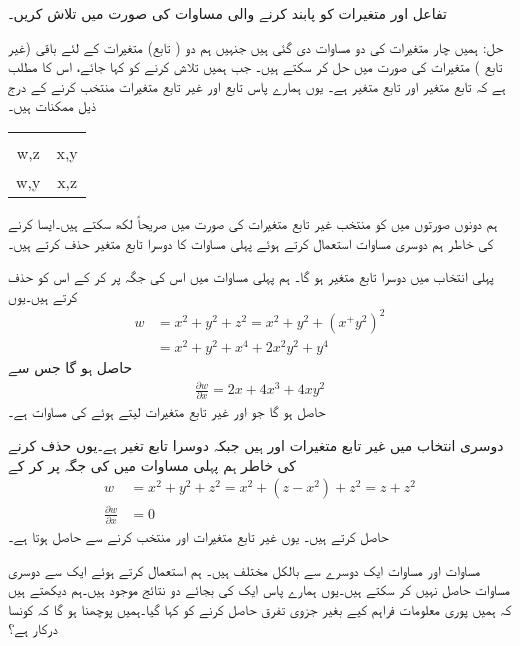 تفاعل  اور متغیرات کو پابند کرنے والی مساوات  کی صورت میں  تلاش کریں۔

حل:\quad
ہمیں چار متغیرات کی دو مساوات دی گئی ہیں جنہیں ہم دو ( تابع)  متغیرات کے لئے  باقی (غیر تابع ) متغیرات کی صورت میں  حل کر سکتے ہیں۔ جب ہمیں  تلاش کرنے کو کہا جائے،  اس کا مطلب ہے کہ  تابع متغیر اور  تابع متغیر ہے۔ یوں ہمارے پاس تابع اور غیر تابع متغیرات منتخب کرنے کے درج ذیل ممکنات ہیں۔
\begin{center}
\begin{tabular}{CC}
&\\
w,z&x,y\\
w,y&x,z
\end{tabular}
\end{center}
ہم دونوں صورتوں میں    کو منتخب غیر تابع متغیرات کی صورت میں  صریحاً لکھ سکتے ہیں۔ایسا کرنے کی خاطر ہم دوسری مساوات   استعمال کرتے ہوئے پہلی مساوات کا    دوسرا تابع متغیر   حذف کرتے ہیں۔ 

پہلی انتخاب میں  دوسرا تابع متغیر ہو گا۔ ہم پہلی مساوات میں اس کی جگہ  پر کر کے اس کو حذف  کرتے ہیں۔یوں
\begin{align*}
w&=x^2+y^2+z^2=x^2+y^2+(x^+y^2)^2\\
&=x^2+y^2+x^4+2x^2y^2+y^4
\end{align*}
حاصل ہو گا جس سے
\begin{align}\label{مساوات_کثیرالمتغیر_پہلا_جواب}
\frac{\partial w}{\partial x}=2x+4x^3+4xy^2
\end{align}
 حاصل ہو گا جو   اور  غیر تابع متغیرات لیتے ہوئے  کی مساوات ہے۔

دوسری  انتخاب میں غیر تابع متغیرات  اور  ہیں جبکہ دوسرا تابع تغیر  ہے۔یوں  حذف  کرنے کی خاطر ہم پہلی مساوات میں  کی جگہ  پر کر کے
\begin{align}
w&=x^2+y^2+z^2=x^2+(z-x^2)+z^2=z+z^2\nonumber\\
\tfrac{\partial w}{\partial x}&=0\label{مساوات_کثیرالمتغیر_دوسرا_جواب}
\end{align}
حاصل کرتے ہیں۔ یوں  غیر تابع متغیرات  اور  منتخب کرنے سے  حاصل ہوتا ہے۔

مساوات  اور مساوات  ایک دوسرے سے بالکل مختلف ہیں۔ ہم  استعمال کرتے ہوئے ایک سے دوسری مساوات حاصل نہیں کر سکتے ہیں۔یوں ہمارے پاس  ایک  کی بجائے  دو نتائج موجود ہیں۔ہم دیکھتے ہیں کہ ہمیں   پوری معلومات فراہم کیے بغیر  جزوی تفرق حاصل کرنے کو کہا گیا۔ہمیں پوچھنا ہو گا کہ کونسا  درکار ہے؟

